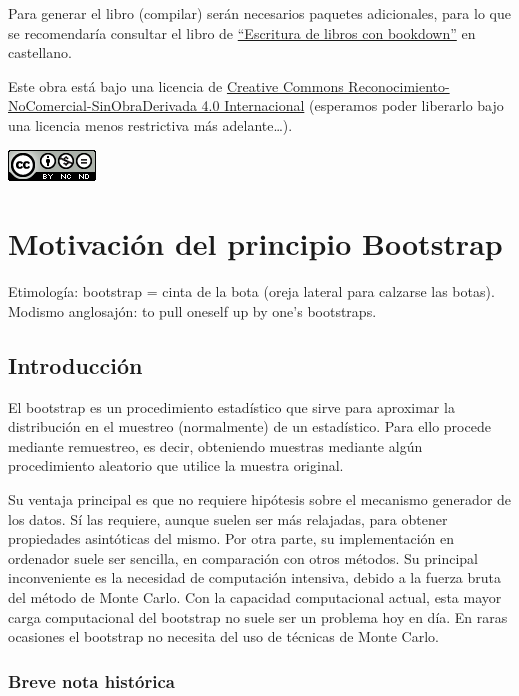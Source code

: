 \documentclass[]{book}
\theoremstyle{definition}
\theoremstyle{definition}
\theoremstyle{definition}
\theoremstyle{remark}
\begin{document}
Para generar el libro (compilar) serán necesarios paquetes adicionales,
para lo que se recomendaría consultar el libro de
\href{https://rubenfcasal.github.io/bookdown_intro}{``Escritura de
libros con bookdown''} en castellano.

Este obra está bajo una licencia de
\href{https://creativecommons.org/licenses/by-nc-nd/4.0/deed.es_ES}{Creative
Commons Reconocimiento-NoComercial-SinObraDerivada 4.0 Internacional}
(esperamos poder liberarlo bajo una licencia menos restrictiva más
adelante\ldots{}).

\includegraphics{by-nc-nd-88x31.png}

\chapter{Motivación del principio Bootstrap}\label{cap1}

Etimología: bootstrap = cinta de la bota (oreja lateral para calzarse
las botas). Modismo anglosajón: to pull oneself up by one's bootstraps.

\section{Introducción}\label{introduccion}

El bootstrap es un procedimiento estadístico que sirve para aproximar la
distribución en el muestreo (normalmente) de un estadístico. Para ello
procede mediante remuestreo, es decir, obteniendo muestras mediante
algún procedimiento aleatorio que utilice la muestra original.

Su ventaja principal es que no requiere hipótesis sobre el mecanismo
generador de los datos. Sí las requiere, aunque suelen ser más
relajadas, para obtener propiedades asintóticas del mismo. Por otra
parte, su implementación en ordenador suele ser sencilla, en comparación
con otros métodos. Su principal inconveniente es la necesidad de
computación intensiva, debido a la fuerza bruta del método de Monte
Carlo. Con la capacidad computacional actual, esta mayor carga
computacional del bootstrap no suele ser un problema hoy en día. En
raras ocasiones el bootstrap no necesita del uso de técnicas de Monte
Carlo.

\subsection{Breve nota histórica}\label{breve-nota-historica}
\end{document}
